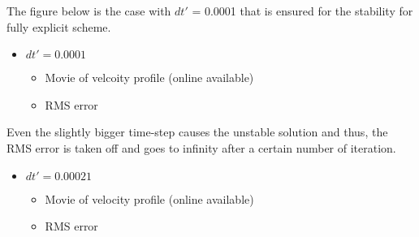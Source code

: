 \documentclass[letterpaper,10pt,english]{sphinxmanual}
\begin{document}
The figure below is the case with \(dt'\) = 0.0001 that is ensured for the stability for fully explicit scheme.
\begin{itemize}
\item {} 
\(dt' = 0.0001\)
\begin{itemize}
\item {} 
Movie of velcoity profile (online available)

\end{itemize}
\begin{figure}[htbp]
\centering

\noindent{}
\end{figure}
\begin{itemize}
\item {} 
RMS error

\end{itemize}
\begin{figure}[htbp]
\centering

\noindent{}
\end{figure}

\end{itemize}

Even the slightly bigger time-step causes the unstable solution and thus, the RMS error is taken off and goes to infinity after a certain number of iteration.
\begin{itemize}
\item {} 
\(dt' = 0.00021\)
\begin{itemize}
\item {} 
Movie of velocity profile (online available)

\end{itemize}
\begin{figure}[htbp]
\centering

\noindent{}
\end{figure}
\begin{itemize}
\item {} 
RMS error

\end{itemize}
\begin{figure}[htbp]
\centering

\noindent{}
\end{figure}

\end{itemize}
\end{document}
